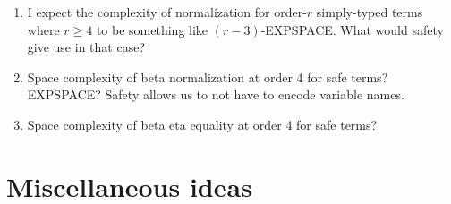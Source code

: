 \documentclass{article}
\begin{document}
\begin{enumerate}
\item I expect the complexity of normalization for order-$r$ simply-typed terms where $r\geq4$ to be something like $(r-3)$-EXPSPACE.
    What would safety give use in that case?

\item Space complexity of beta normalization at order 4 for safe terms?
EXPSPACE? Safety allows us to not have to encode variable names.

\item Space complexity of beta eta equality at order 4 for safe terms?

\end{enumerate}

\section{Miscellaneous ideas}
\label{sec:misc}
\end{document}
